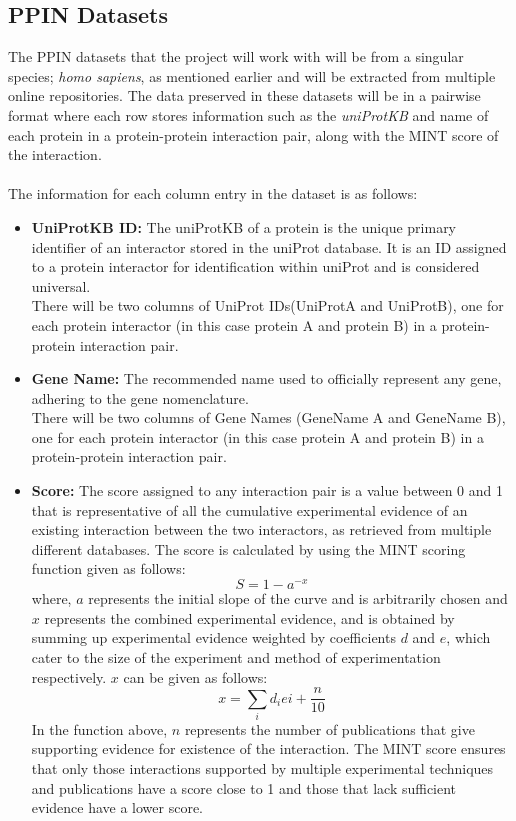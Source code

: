 
\subsection{PPIN Datasets}
The PPIN datasets that the project will work with will be from a singular species; \textit{homo sapiens}, as mentioned earlier and will be extracted from multiple online repositories. The data preserved in these datasets will be in a pairwise format where each row stores information such as the \textit{uniProtKB} and name of each protein in a protein-protein interaction pair, along with the MINT score of the interaction.\\\\
The information for each column entry in the dataset is as follows:
\begin{itemize}
    \item \textbf{UniProtKB ID:} The uniProtKB of a protein is the unique primary identifier of an interactor stored in the uniProt database. It is an ID assigned to a protein interactor for identification within uniProt and is considered universal.\\
    There will be two columns of UniProt IDs(UniProtA and UniProtB), one for each protein interactor (in this case protein A and protein B) in a protein-protein interaction pair.
    \item \textbf{Gene Name:} The recommended name used to officially represent any gene, adhering to the gene nomenclature.\\
    There will be two columns of Gene Names (GeneName A and GeneName B), one for each protein interactor (in this case protein A and protein B) in a protein-protein interaction pair.
    \item \textbf{Score:} The score assigned to any interaction pair is a value between 0 and 1 that is representative of all the cumulative experimental evidence of an existing interaction between the two interactors, as retrieved from multiple different databases. The score is calculated by using the MINT scoring function given as follows:
    $$S = 1-a^{-x}$$
    where, $a$ represents the initial slope of the curve and is arbitrarily chosen and $x$ represents the combined experimental evidence, and is obtained by summing up experimental evidence weighted by coefficients $d$ and $e$, which cater to the size of the experiment and method of experimentation respectively. $x$ can be given as follows:
    $$x = \sum_{i}d_{i}e{i} + \frac{n}{10}$$
    In the function above, $n$ represents the number of publications that give supporting evidence for existence of the interaction.
    The MINT score ensures that only those interactions supported by multiple experimental techniques and publications have a score close to 1 and those that lack sufficient evidence have a lower score. 
\end{itemize}


